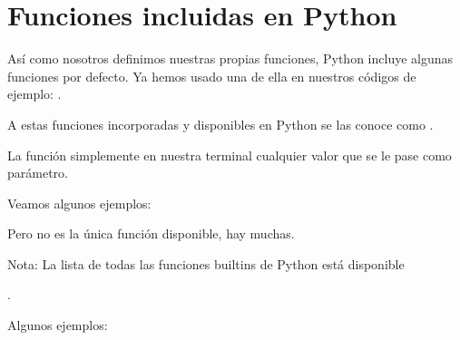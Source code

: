 \documentclass[a5paper,9pt,spanish]{sphinxmanual}
\begin{document}
\sphinxstepscope


\chapter{Funciones incluidas en Python}
\label{\detokenize{builtins:funciones-incluidas-en-python}}\label{\detokenize{builtins::doc}}
\sphinxAtStartPar
Así como nosotros definimos nuestras propias funciones, Python incluye
algunas funciones por defecto. Ya hemos usado una de ella en nuestros códigos de
ejemplo: .

\sphinxAtStartPar
A estas funciones incorporadas y disponibles en Python se las conoce como .

\sphinxAtStartPar
La función  simplemente  en nuestra terminal cualquier
valor que se le pase como parámetro.

\sphinxAtStartPar
Veamos algunos ejemplos:

\begin{sphinxVerbatim}[commandchars=\\\{\}]
  
\end{sphinxVerbatim}

\sphinxAtStartPar
Pero  no es la única función disponible, hay muchas.

\sphinxAtStartPar
Nota: La lista de todas las funciones built\sphinxhyphen{}ins de Python está disponible
%
\begin{footnote}[4]\sphinxAtStartFootnote
{}
%
\end{footnote}.

\sphinxAtStartPar
Algunos ejemplos:
\end{document}
